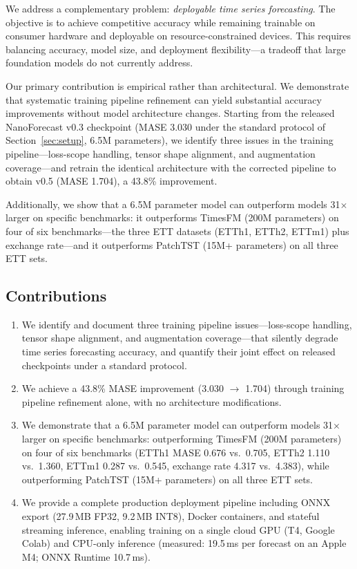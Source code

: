 \documentclass[11pt]{article}
\begin{document}
We address a complementary problem: \emph{deployable time series forecasting}. The objective is to achieve competitive accuracy while remaining trainable on consumer hardware and deployable on resource-constrained devices. This requires balancing accuracy, model size, and deployment flexibility---a tradeoff that large foundation models do not currently address.

Our primary contribution is empirical rather than architectural. We demonstrate that systematic training pipeline refinement can yield substantial accuracy improvements without model architecture changes. Starting from the released NanoForecast v0.3 checkpoint (MASE 3.030 under the standard protocol of Section~\ref{sec:setup}, 6.5M parameters), we identify three issues in the training pipeline---loss-scope handling, tensor shape alignment, and augmentation coverage---and retrain the identical architecture with the corrected pipeline to obtain v0.5 (MASE 1.704), a 43.8\% improvement.

Additionally, we show that a 6.5M parameter model can outperform models 31$\times$ larger on specific benchmarks: it outperforms TimesFM (200M parameters) on four of six benchmarks---the three ETT datasets (ETTh1, ETTh2, ETTm1) plus exchange rate---and it outperforms PatchTST (15M+ parameters) on all three ETT sets.

\subsection{Contributions}
\label{sec:contributions}

\begin{enumerate}
\item We identify and document three training pipeline issues---loss-scope handling, tensor shape alignment, and augmentation coverage---that silently degrade time series forecasting accuracy, and quantify their joint effect on released checkpoints under a standard protocol.
\item We achieve a 43.8\% MASE improvement (3.030 $\to$ 1.704) through training pipeline refinement alone, with no architecture modifications.
\item We demonstrate that a 6.5M parameter model can outperform models 31$\times$ larger on specific benchmarks: outperforming TimesFM (200M parameters) on four of six benchmarks (ETTh1 MASE 0.676 vs.\ 0.705, ETTh2 1.110 vs.\ 1.360, ETTm1 0.287 vs.\ 0.545, exchange rate 4.317 vs.\ 4.383), while outperforming PatchTST (15M+ parameters) on all three ETT sets.
\item We provide a complete production deployment pipeline including ONNX export (27.9\,MB FP32, 9.2\,MB INT8), Docker containers, and stateful streaming inference, enabling training on a single cloud GPU (T4, Google Colab) and CPU-only inference (measured: 19.5\,ms per forecast on an Apple M4; ONNX Runtime 10.7\,ms).
\end{enumerate}
\end{document}
